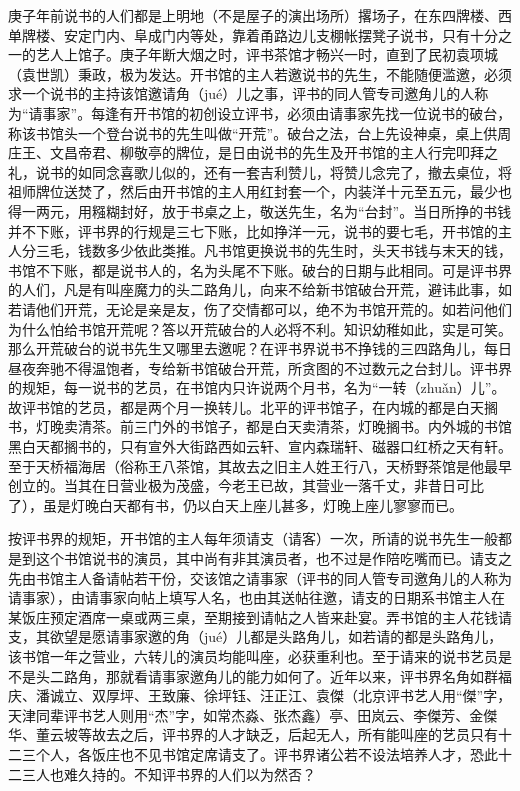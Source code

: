 \documentclass[12pt,UTF8]{ctexbook}
\begin{document}
庚子年前说书的人们都是上明地（不是屋子的演出场所）撂场子，在东四牌楼、西单牌楼、安定门内、阜成门内等处，靠着甬路边儿支棚帐摆凳子说书，只有十分之一的艺人上馆子。庚子年断大烟之时，评书茶馆才畅兴一时，直到了民初袁项城（袁世凯）秉政，极为发达。开书馆的主人若邀说书的先生，不能随便滥邀，必须求一个说书的主持该馆邀请角（jué）儿之事，评书的同人管专司邀角儿的人称为“请事家”。每逢有开书馆的初创设立评书，必须由请事家先找一位说书的破台，称该书馆头一个登台说书的先生叫做“开荒”。破台之法，台上先设神桌，桌上供周庄王、文昌帝君、柳敬亭的牌位，是日由说书的先生及开书馆的主人行完叩拜之礼，说书的如同念喜歌儿似的，还有一套吉利赞儿，将赞儿念完了，撤去桌位，将祖师牌位送焚了，然后由开书馆的主人用红封套一个，内装洋十元至五元，最少也得一两元，用糨糊封好，放于书桌之上，敬送先生，名为“台封”。当日所挣的书钱并不下账，评书界的行规是三七下账，比如挣洋一元，说书的要七毛，开书馆的主人分三毛，钱数多少依此类推。凡书馆更换说书的先生时，头天书钱与末天的钱，书馆不下账，都是说书人的，名为头尾不下账。破台的日期与此相同。可是评书界的人们，凡是有叫座魔力的头二路角儿，向来不给新书馆破台开荒，避讳此事，如若请他们开荒，无论是亲是友，伤了交情都可以，绝不为书馆开荒的。如若问他们为什么怕给书馆开荒呢？答以开荒破台的人必将不利。知识幼稚如此，实是可笑。那么开荒破台的说书先生又哪里去邀呢？在评书界说书不挣钱的三四路角儿，每日昼夜奔驰不得温饱者，专给新书馆破台开荒，所贪图的不过数元之台封儿。评书界的规矩，每一说书的艺员，在书馆内只许说两个月书，名为“一转（zhuǎn）儿”。故评书馆的艺员，都是两个月一换转儿。北平的评书馆子，在内城的都是白天搁书，灯晚卖清茶。前三门外的书馆子，都是白天卖清茶，灯晚搁书。内外城的书馆黑白天都搁书的，只有宣外大街路西如云轩、宣内森瑞轩、磁器口红桥之天有轩。至于天桥福海居（俗称王八茶馆，其故去之旧主人姓王行八，天桥野茶馆是他最早创立的。当其在日营业极为茂盛，今老王已故，其营业一落千丈，非昔日可比了），虽是灯晚白天都有书，仍以白天上座儿甚多，灯晚上座儿寥寥而已。

按评书界的规矩，开书馆的主人每年须请支（请客）一次，所请的说书先生一般都是到这个书馆说书的演员，其中尚有非其演员者，也不过是作陪吃嘴而已。请支之先由书馆主人备请帖若干份，交该馆之请事家（评书的同人管专司邀角儿的人称为请事家），由请事家向帖上填写人名，也由其送帖往邀，请支的日期系书馆主人在某饭庄预定酒席一桌或两三桌，至期接到请帖之人皆来赴宴。弄书馆的主人花钱请支，其欲望是愿请事家邀的角（jué）儿都是头路角儿，如若请的都是头路角儿，该书馆一年之营业，六转儿的演员均能叫座，必获重利也。至于请来的说书艺员是不是头二路角，那就看请事家邀角儿的能力如何了。近年以来，评书界名角如群福庆、潘诚立、双厚坪、王致廉、徐坪钰、汪正江、袁傑（北京评书艺人用“傑”字，天津同辈评书艺人则用“杰”字，如常杰淼、张杰鑫）亭、田岚云、李傑芳、金傑华、董云坡等故去之后，评书界的人才缺乏，后起无人，所有能叫座的艺员只有十二三个人，各饭庄也不见书馆定席请支了。评书界诸公若不设法培养人才，恐此十二三人也难久持的。不知评书界的人们以为然否？
\end{document}

